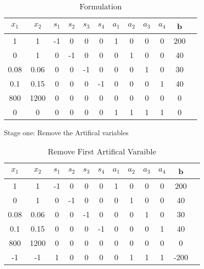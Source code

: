 \documentclass{article}
\begin{document}
  \begin{table}[H]
  \centering
  \caption{Formulation}
  \label{my-label}
  \begin{tabular}{|c|c|c|c|c|c|c|c|c|c|c|c|}
  \hline
  $x_1$ & $x_2$ & $s_1$  & $s_2$ & $s_3$ & $s_4$ & $a_1$ & $a_2$ & $a_3$ & $a_4$ & b  \\ \hline
  1    & 1    & -1       & 0    & 0    & 0    & 1    & 0    & 0    & 0 & 200 \\ \hline
  0    & 1    & 0        & -1   & 0    & 0    & 0    & 1    & 0    & 0 & 40  \\ \hline
  0.08 & 0.06 & 0        & 0    & -1   & 0    & 0    & 0    & 1    & 0 & 30  \\ \hline
  0.1  & 0.15 & 0        & 0    & 0    & -1   & 0    & 0    & 0    & 1 & 40  \\ \hline
  800  & 1200 & 0        & 0    & 0    & 0    & 0    & 0    & 0    & 0 & 0   \\ \hline
  0    & 0    & 0        & 0    & 0    & 0    & 1    & 1    & 1    & 1 & 0   \\ \hline
  \end{tabular}
  \end{table}
 
 Stage one: Remove the Artifical variables

  \begin{table}[H]
  \centering
  \caption{Remove First Artifical Varaible}
  \label{my-label}
  \begin{tabular}{|c|c|c|c|c|c|c|c|c|c|c|c|}
  \hline
  $x_1$ & $x_2$ & $s_1$  & $s_2$ & $s_3$ & $s_4$ & $a_1$ & $a_2$ & $a_3$ & $a_4$ & b  \\ \hline
  1    & 1    & -1       & 0    & 0    & 0    & 1    & 0    & 0    & 0 & 200 \\ \hline
  0    & 1    & 0        & -1   & 0    & 0    & 0    & 1    & 0    & 0 & 40  \\ \hline
  0.08 & 0.06 & 0        & 0    & -1   & 0    & 0    & 0    & 1    & 0 & 30  \\ \hline
  0.1  & 0.15 & 0        & 0    & 0    & -1   & 0    & 0    & 0    & 1 & 40  \\ \hline
  800  & 1200 & 0        & 0    & 0    & 0    & 0    & 0    & 0    & 0 & 0   \\ \hline
  -1   & -1   & 1        & 0    & 0    & 0    & 0    & 1    & 1    & 1 & -200    \\ \hline
  \end{tabular}
  \end{table}
\end{document}
